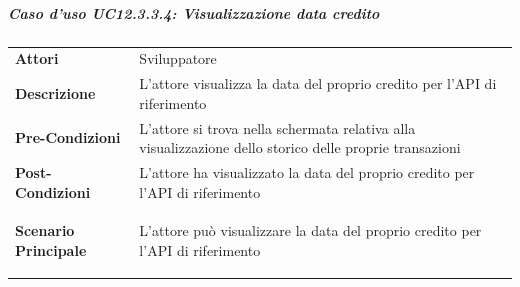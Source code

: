 \subparagraph{Caso d'uso UC12.3.3.4: Visualizzazione data credito}
\label{UC12_3_3_4}

\begin{minipage}{\linewidth}
	\begin{tabular}{ l | p{11cm}}
		\hline
		\rowcolor{Gray}
		\multicolumn{2}{c}{UC12.3.3.4 - Visualizzazione data credito} \\
		\hline
		\textbf{Attori} & Sviluppatore \\
		\textbf{Descrizione} & L'attore visualizza la data del proprio credito per l'API di riferimento \\
	\textbf{Pre-Condizioni} & L'attore si trova nella schermata relativa alla visualizzazione dello storico delle proprie transazioni \\
	\textbf{Post-Condizioni} & L'attore ha visualizzato la data del proprio credito per l'API di riferimento \\
	\textbf{Scenario Principale} & 
	\begin{enumerate*}[label=(\arabic*.),itemjoin={\newline}]
		\item L'attore può visualizzare la data del proprio credito per l'API di riferimento
	\end{enumerate*}
	\end{tabular}
\end{minipage}